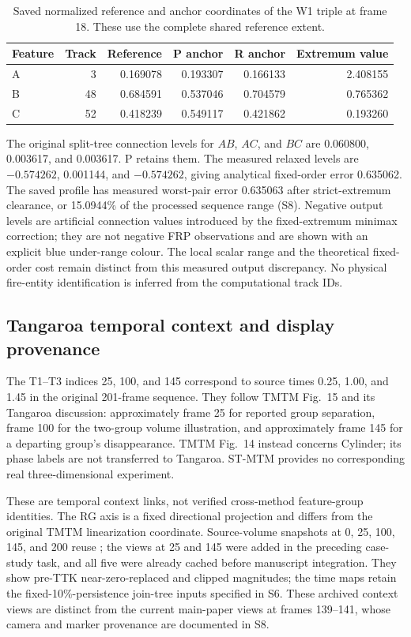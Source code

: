 \begin{table}[H]\centering\small
\caption{Saved normalized reference and anchor coordinates of the W1 triple at frame 18. These use the complete shared reference extent.}\label{tab:s_fire_positions}
\begin{tabular}{lrrrrr}\toprule
Feature & Track & Reference & P anchor & R anchor & Extremum value\\\midrule
A & 3 & 0.169078 & 0.193307 & 0.166133 & 2.408155\\
B & 48 & 0.684591 & 0.537046 & 0.704579 & 0.765362\\
C & 52 & 0.418239 & 0.549117 & 0.421862 & 0.193260\\
\bottomrule\end{tabular}\end{table}

The original split-tree connection levels for $AB$, $AC$, and $BC$ are 0.060800, 0.003617, and 0.003617. P retains them. The measured relaxed levels are $-0.574262$, 0.001144, and $-0.574262$, giving analytical fixed-order error 0.635062. The saved profile has measured worst-pair error 0.635063 after strict-extremum clearance, or 15.0944\% of the processed sequence range (S8). Negative output levels are artificial connection values introduced by the fixed-extremum minimax correction; they are not negative FRP observations and are shown with an explicit blue under-range colour. The local scalar range and the theoretical fixed-order cost remain distinct from this measured output discrepancy. No physical fire-entity identification is inferred from the computational track IDs.

\subsection{Tangaroa temporal context and display provenance}
The T1--T3 indices 25, 100, and 145 correspond to source times 0.25, 1.00, and 1.45 in the original 201-frame sequence. They follow TMTM Fig.~15 and its Tangaroa discussion: approximately frame 25 for reported group separation, frame 100 for the two-group volume illustration, and approximately frame 145 for a departing group's disappearance. TMTM Fig.~14 instead concerns Cylinder; its phase labels are not transferred to Tangaroa. ST-MTM provides no corresponding real three-dimensional experiment.

These are temporal context links, not verified cross-method feature-group identities. The RG axis is a fixed directional projection and differs from the original TMTM linearization coordinate. Source-volume snapshots at 0, 25, 100, 145, and 200 reuse ; the views at 25 and 145 were added in the preceding case-study task, and all five were already cached before manuscript integration. They show pre-TTK near-zero-replaced and clipped magnitudes; the time maps retain the fixed-10\%-persistence join-tree inputs specified in S6. These archived context views are distinct from the current main-paper views at frames 139--141, whose camera and marker provenance are documented in S8.

